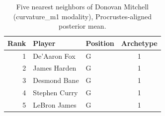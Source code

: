 \begin{table}[htbp]
  \centering\small
  \begin{tabular}{rllc}
    \toprule
    Rank & Player & Position & Archetype \\
    \midrule
    1 & De'Aaron Fox & G & 1 \\
    2 & James Harden & G & 1 \\
    3 & Desmond Bane & G & 1 \\
    4 & Stephen Curry & G & 1 \\
    5 & LeBron James & G & 1 \\
    \bottomrule
  \end{tabular}
  \caption{Five nearest neighbors of Donovan Mitchell (curvature_m1 modality), Procrustes-aligned posterior mean.}
  \label{tab:Donovan_Mitchell_neighbors_curvature_m1}
\end{table}

